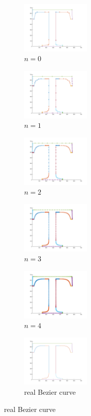 \documentclass[paper=a4, fontsize=11pt]{scrartcl}
\begin{document}
\begin{figure}[htb]
	\centering
	\begin{subfigure}{0.3\textwidth}
		\includegraphics[width=125px]{./img/hw0.png}
		\caption{$n=0$}
	\end{subfigure}\hfil %
	\begin{subfigure}{0.3\textwidth}
		\includegraphics[width=125px]{./img/hw1.png}
		\caption{$n=1$}
	\end{subfigure}\hfil %
	\begin{subfigure}{0.3\textwidth}
		\includegraphics[width=125px]{./img/hw2.png}
		\caption{$n=2$}
	\end{subfigure}\hfil
	\begin{subfigure}{0.3\textwidth}
	\includegraphics[width=125px]{./img/hw3.png}
	\caption{$n=3$}
	\end{subfigure}\hfil
	\begin{subfigure}{0.3\textwidth}
	\includegraphics[width=125px]{./img/hw4.png}
	\caption{$n=4$}
	\end{subfigure}\hfil
	\begin{subfigure}{0.3\textwidth}
	\includegraphics[width=125px]{./img/real.png}
	\caption{real Bezier curve}
	\end{subfigure}\hfil
\end{figure}
\end{document}
